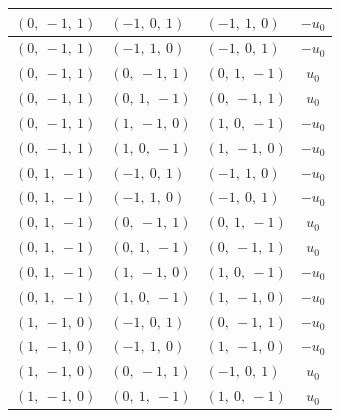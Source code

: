 \documentclass[11pt]{article}
\theoremstyle{definition}
\begin{document}
\begin{longtable}{|l|l|l|c|}
    \hline
    $\left( 0, \  -1, \  1\right)$ & $\left( -1, \  0, \  1\right)$ & $\left( -1, \  1, \  0\right)$ & $- u_{0}$ \\
    \hline
    $\left( 0, \  -1, \  1\right)$ & $\left( -1, \  1, \  0\right)$ & $\left( -1, \  0, \  1\right)$ & $- u_{0}$ \\
    \hline
    $\left( 0, \  -1, \  1\right)$ & $\left( 0, \  -1, \  1\right)$ & $\left( 0, \  1, \  -1\right)$ & $u_{0}$ \\
    \hline
    $\left( 0, \  -1, \  1\right)$ & $\left( 0, \  1, \  -1\right)$ & $\left( 0, \  -1, \  1\right)$ & $u_{0}$ \\
    \hline
    $\left( 0, \  -1, \  1\right)$ & $\left( 1, \  -1, \  0\right)$ & $\left( 1, \  0, \  -1\right)$ & $- u_{0}$ \\
    \hline
    $\left( 0, \  -1, \  1\right)$ & $\left( 1, \  0, \  -1\right)$ & $\left( 1, \  -1, \  0\right)$ & $- u_{0}$ \\
    \hline
    $\left( 0, \  1, \  -1\right)$ & $\left( -1, \  0, \  1\right)$ & $\left( -1, \  1, \  0\right)$ & $- u_{0}$ \\
    \hline
    $\left( 0, \  1, \  -1\right)$ & $\left( -1, \  1, \  0\right)$ & $\left( -1, \  0, \  1\right)$ & $- u_{0}$ \\
    \hline
    $\left( 0, \  1, \  -1\right)$ & $\left( 0, \  -1, \  1\right)$ & $\left( 0, \  1, \  -1\right)$ & $u_{0}$ \\
    \hline
    $\left( 0, \  1, \  -1\right)$ & $\left( 0, \  1, \  -1\right)$ & $\left( 0, \  -1, \  1\right)$ & $u_{0}$ \\
    \hline
    $\left( 0, \  1, \  -1\right)$ & $\left( 1, \  -1, \  0\right)$ & $\left( 1, \  0, \  -1\right)$ & $- u_{0}$ \\
    \hline
    $\left( 0, \  1, \  -1\right)$ & $\left( 1, \  0, \  -1\right)$ & $\left( 1, \  -1, \  0\right)$ & $- u_{0}$ \\
    \hline
    $\left( 1, \  -1, \  0\right)$ & $\left( -1, \  0, \  1\right)$ & $\left( 0, \  -1, \  1\right)$ & $- u_{0}$ \\
    \hline
    $\left( 1, \  -1, \  0\right)$ & $\left( -1, \  1, \  0\right)$ & $\left( 1, \  -1, \  0\right)$ & $- u_{0}$ \\
    \hline
    $\left( 1, \  -1, \  0\right)$ & $\left( 0, \  -1, \  1\right)$ & $\left( -1, \  0, \  1\right)$ & $u_{0}$ \\
    \hline
    $\left( 1, \  -1, \  0\right)$ & $\left( 0, \  1, \  -1\right)$ & $\left( 1, \  0, \  -1\right)$ & $u_{0}$ \\

\end{longtable}
\end{document}
